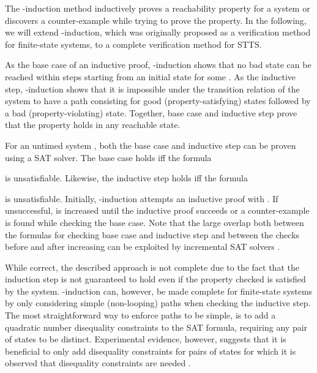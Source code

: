 The -induction method \cite{SheeranEtAl:FMCAD2000,EenSorensson:2003}
inductively proves a reachability property for a system or
discovers a counter-example while trying to prove the property.
In the following, we will extend -induction,
which was originally proposed as a verification method for finite-state systems,
to a complete verification method for STTS.

As the base case of an inductive proof, -induction shows that no bad
state can be reached within  steps starting from an initial state
for some . As the inductive step, -induction shows that it is impossible under the transition relation of the system to have a path consisting for  good (property-satisfying) states followed by a bad (property-violating) state. Together, base case and inductive step prove that the property holds in any reachable state.

For an untimed system ,
both the base case and inductive step can be proven using a SAT solver.
The base case holds iff the formula

is unsatisfiable. Likewise, the inductive step holds iff the formula

is unsatisfiable.
Initially, -induction attempts an inductive proof with . If unsuccessful,  is increased until the inductive proof succeeds or a counter-example is found while checking the base case.
Note that the large overlap both between the formulas for checking base case and inductive step and between the checks before and after increasing  can be exploited by incremental SAT solvers \cite{EenSorensson:2003}.


While correct, the described approach is not complete due to the fact that the induction step is not guaranteed to hold even if the property checked is satisfied by the system. -induction can, however, be made complete for finite-state systems by only considering simple (non-looping) paths when checking the inductive step.
The most straightforward way to enforce paths to be simple, is to add a quadratic number disequality constraints to the SAT formula, requiring any pair of states to be distinct. Experimental evidence, however, suggests that it is beneficial to only add disequality constraints for pairs of states for which it is observed that disequality constraints are needed \cite{EenSorensson:2003}. 


